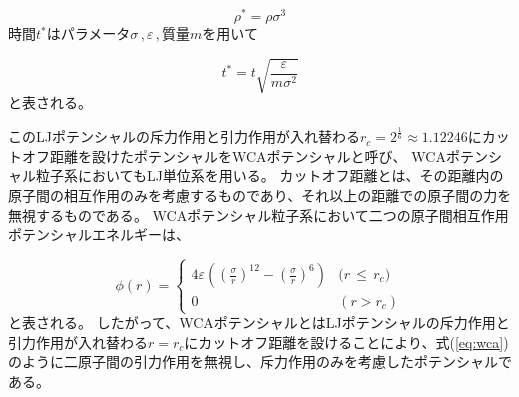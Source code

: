 \documentclass[titlepage]{jsreport}
\begin{document}
\large
\begin{equation}
\rho^*=\rho{\sigma}^3\label{eq:rho}
\end{equation}
\normalsize
時間$t^*$はパラメータ${\sigma}$\,,\,${\varepsilon}$\,,\,質量$m$を用いて

\large
\begin{equation}
t^*=t\sqrt{\frac{\varepsilon}{m{\sigma}^2}}\label{eq:time}
\end{equation}
\normalsize
と表される。

このLJポテンシャルの斥力作用と引力作用が入れ替わる$r_c=2^{\frac{1}{6}}{\approx}1.12246$にカットオフ距離を設けたポテンシャルをWCAポテンシャルと呼び、
WCAポテンシャル粒子系においてもLJ単位系を用いる。
カットオフ距離とは、その距離内の原子間の相互作用のみを考慮するものであり、それ以上の距離での原子間の力を無視するものである\cite{WATANABE20191}。
WCAポテンシャル粒子系において二つの原子間相互作用ポテンシャルエネルギーは、

\large
\begin{equation}
\phi(r) = \left\{ \begin{array}{ll}
    4{\varepsilon}\left(\left(\frac{\sigma}{r}\right)^{12}-\left(\frac{\sigma}{r}\right)^6\right) & (r\,{\leq}\,{r_c)} \\
    0 & (r>r_c)\label{eq:wca}
\end{array} \right.
\end{equation}
\normalsize
と表される\cite{doi:10.1063/1.2176675}。
したがって、WCAポテンシャルとはLJポテンシャルの斥力作用と引力作用が入れ替わる$r=r_c$にカットオフ距離を設けることにより、式(\ref{eq:wca})のように二原子間の引力作用を無視し、斥力作用のみを考慮したポテンシャルである。
\end{document}
